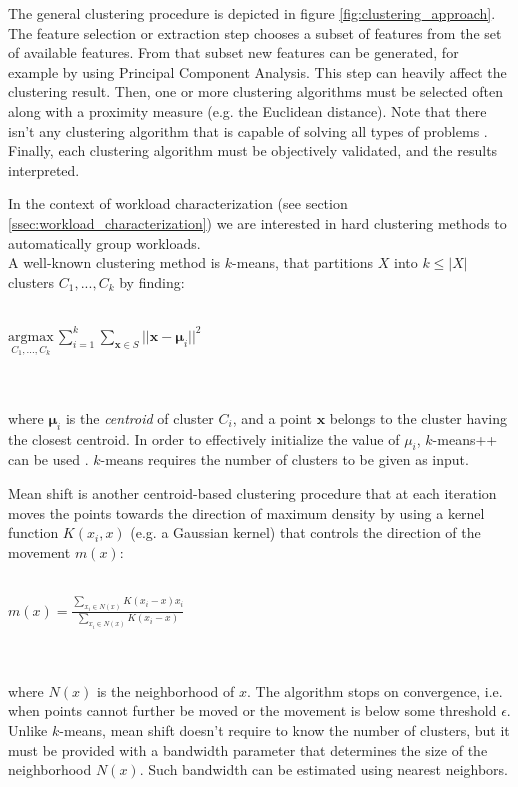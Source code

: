 \documentclass[a4paper, 12pt]{article} %
\begin{document}
	The general clustering procedure is depicted in figure \ref{fig:clustering_approach}. The feature selection or extraction step chooses a subset of features from the set of available features. From that subset new features can be generated, for example by using Principal Component Analysis. This step can heavily affect the clustering result. Then, one or more clustering algorithms must be selected often along with a proximity measure (e.g. the Euclidean distance). Note that there isn't any clustering algorithm that is capable of solving all types of problems \cite{ImpossibleTheoremForClustering}. Finally, each clustering algorithm must be objectively validated, and the results interpreted.
	
	In the context of workload characterization (see section \ref{ssec:workload_characterization}) we are interested in hard clustering methods to automatically group workloads. \\
	A well-known clustering method is $k$-means, that partitions $X$ into $k \leq |X|$ clusters $C_1, ..., C_k$ by finding:\\\\
	\centerline{
	$
	\underset{C_1, ..., C_k}{\mathrm{argmax}} \, \sum_{i=1}^{k} \underset{{\pmb{x} \in S}}{\sum} || \pmb{x} - \pmb{\mu}_i ||^2
	$
	} \\\\
	where $\pmb{\mu}_i$ is the \textit{centroid} of cluster $C_i$, and a point $\pmb{x}$ belongs to the cluster having the closest centroid. In order to effectively initialize the value of $\mu_i$, $k$-means++ can be used \cite{kmeans++}. $k$-means requires the number of clusters to be given as input.
	
	Mean shift \cite{MeanShift} is another centroid-based clustering procedure that at each iteration moves the points towards the direction of maximum density by using a kernel function $K(x_i, x)$ (e.g. a Gaussian kernel) that controls the direction of the movement $m(x)$:\\\\
	\centerline{
		$
		m(x) = \frac{\sum_{x_i \in N(x)} K(x_i - x)x_i}{\sum_{x_i \in N(x)} K(x_i - x)}
		$
	} \\\\
	where $N(x)$ is the neighborhood of $x$. The algorithm stops on convergence, i.e. when points cannot further be moved or the movement is below some threshold $\epsilon$. Unlike $k$-means, mean shift doesn't require to know the number of clusters, but it must be provided with a bandwidth parameter that determines the size of the neighborhood $N(x)$. Such bandwidth can be estimated using nearest neighbors.
	
\end{document}
